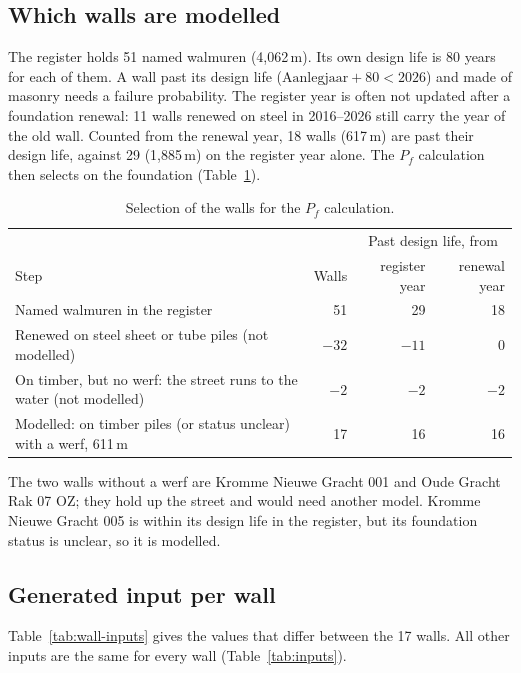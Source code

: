 \subsection{Which walls are modelled}\label{app:data-selection}

The register holds 51 named walmuren (4{,}062\,m). Its own design life is
80 years for each of them. A wall past its design life ($\text{Aanlegjaar} + 80
< 2026$) and made of masonry needs a failure probability. The register year is
often not updated after a foundation renewal: 11 walls renewed on steel in
2016--2026 still carry the year of the old wall. Counted from the renewal
year, 18 walls (617\,m) are past their design life, against 29 (1{,}885\,m) on
the register year alone. The $P_f$ calculation then selects on the
foundation (Table~\ref{tab:selection}).

\begin{table}[htbp]
\centering
\small
\caption{Selection of the walls for the $P_f$ calculation.}
\label{tab:selection}
\begin{tabularx}{\textwidth}{@{}X r r r@{}}
\toprule
& & \multicolumn{2}{c}{Past design life, from} \\
Step & Walls & register year & renewal year \\
\midrule
Named walmuren in the register & 51 & 29 & 18 \\
\quad Renewed on steel sheet or tube piles (not modelled) & $-32$ & $-11$ & 0 \\
\quad On timber, but no werf: the street runs to the water (not modelled) & $-2$ & $-2$ & $-2$ \\
Modelled: on timber piles (or status unclear) with a werf, 611\,m & 17 & 16 & 16 \\
\bottomrule
\end{tabularx}
\end{table}

The two walls without a werf are Kromme Nieuwe Gracht 001 and Oude Gracht
Rak 07 OZ; they hold up the street and would need another model. Kromme
Nieuwe Gracht 005 is within its design life in the register, but its
foundation status is unclear, so it is modelled.

\subsection{Generated input per wall}\label{app:data-walls}

Table~\ref{tab:wall-inputs} gives the values that differ between the 17
walls. All other inputs are the same for every wall (Table~\ref{tab:inputs}).

